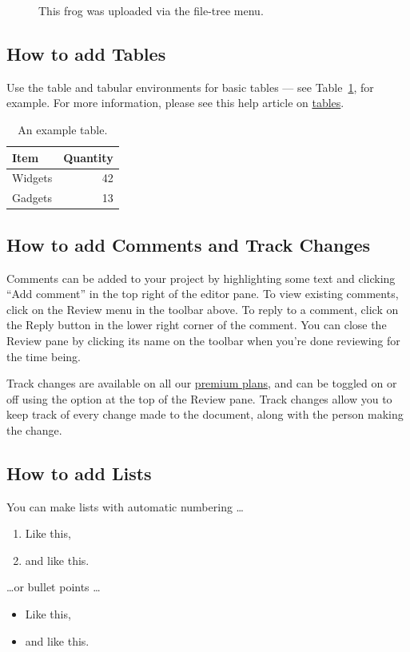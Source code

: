 \documentclass{article}
\begin{document}
\begin{figure}
\centering
\caption{\label{fig:frog}This frog was uploaded via the file-tree menu.}
\end{figure}

\subsection{How to add Tables}

Use the table and tabular environments for basic tables --- see Table~\ref{tab:widgets}, for example. For more information, please see this help article on \href{https://www.overleaf.com/learn/latex/tables}{tables}. 

\begin{table}
\centering
\begin{tabular}{l|r}
Item & Quantity \\\hline
Widgets & 42 \\
Gadgets & 13
\end{tabular}
\caption{\label{tab:widgets}An example table.}
\end{table}

\subsection{How to add Comments and Track Changes}

Comments can be added to your project by highlighting some text and clicking ``Add comment'' in the top right of the editor pane. To view existing comments, click on the Review menu in the toolbar above. To reply to a comment, click on the Reply button in the lower right corner of the comment. You can close the Review pane by clicking its name on the toolbar when you're done reviewing for the time being.

Track changes are available on all our \href{https://www.overleaf.com/user/subscription/plans}{premium plans}, and can be toggled on or off using the option at the top of the Review pane. Track changes allow you to keep track of every change made to the document, along with the person making the change. 

\subsection{How to add Lists}

You can make lists with automatic numbering \dots

\begin{enumerate}
\item Like this,
\item and like this.
\end{enumerate}
\dots or bullet points \dots
\begin{itemize}
\item Like this,
\item and like this.
\end{itemize}
\end{document}
